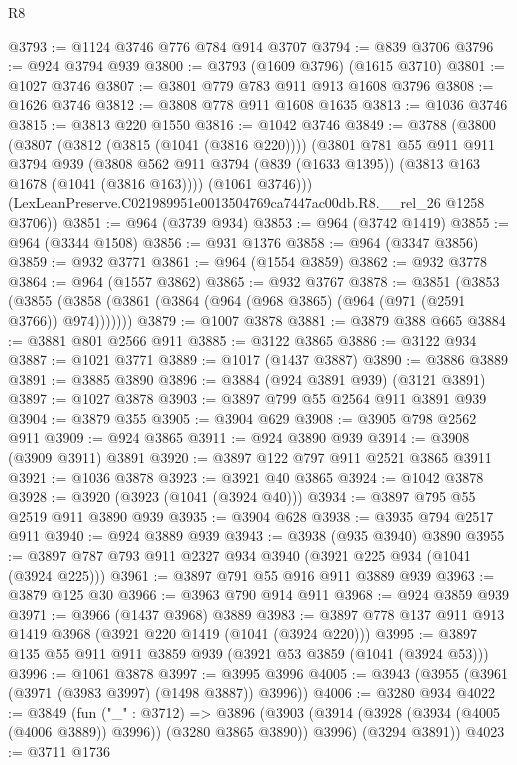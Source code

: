 \begin{lexlean}{R8}
\begin{coremodule}
@3793 := @1124 @3746 @776 @784 @914 @3707
@3794 := @839 @3706
@3796 := @924 @3794 @939
@3800 := @3793 (@1609 @3796) (@1615 @3710)
@3801 := @1027 @3746
@3807 := @3801 @779 @783 @911 @913 @1608 @3796
@3808 := @1626 @3746
@3812 := @3808 @778 @911 @1608 @1635
@3813 := @1036 @3746
@3815 := @3813 @220 @1550
@3816 := @1042 @3746
@3849 := @3788
    (@3800
      (@3807
        (@3812 (@3815 (@1041 (@3816 @220))))
        (@3801
          @781
          @55
          @911
          @911
          @3794
          @939
          (@3808 @562 @911 @3794 (@839 (@1633 @1395)) (@3813 @163 @1678 (@1041 (@3816 @163))))
          (@1061 @3746)))
      (LexLeanPreserve.C021989951e0013504769ca7447ac00db.R8.__rel_26 @1258 @3706))
@3851 := @964 (@3739 @934)
@3853 := @964 (@3742 @1419)
@3855 := @964 (@3344 @1508)
@3856 := @931 @1376
@3858 := @964 (@3347 @3856)
@3859 := @932 @3771
@3861 := @964 (@1554 @3859)
@3862 := @932 @3778
@3864 := @964 (@1557 @3862)
@3865 := @932 @3767
@3878 := @3851
    (@3853 (@3855 (@3858 (@3861 (@3864 (@964 (@968 @3865) (@964 (@971 (@2591 @3766)) @974)))))))
@3879 := @1007 @3878
@3881 := @3879 @388 @665
@3884 := @3881 @801 @2566 @911
@3885 := @3122 @3865
@3886 := @3122 @934
@3887 := @1021 @3771
@3889 := @1017 (@1437 @3887)
@3890 := @3886 @3889
@3891 := @3885 @3890
@3896 := @3884 (@924 @3891 @939) (@3121 @3891)
@3897 := @1027 @3878
@3903 := @3897 @799 @55 @2564 @911 @3891 @939
@3904 := @3879 @355
@3905 := @3904 @629
@3908 := @3905 @798 @2562 @911
@3909 := @924 @3865
@3911 := @924 @3890 @939
@3914 := @3908 (@3909 @3911) @3891
@3920 := @3897 @122 @797 @911 @2521 @3865 @3911
@3921 := @1036 @3878
@3923 := @3921 @40 @3865
@3924 := @1042 @3878
@3928 := @3920 (@3923 (@1041 (@3924 @40)))
@3934 := @3897 @795 @55 @2519 @911 @3890 @939
@3935 := @3904 @628
@3938 := @3935 @794 @2517 @911
@3940 := @924 @3889 @939
@3943 := @3938 (@935 @3940) @3890
@3955 := @3897 @787 @793 @911 @2327 @934 @3940 (@3921 @225 @934 (@1041 (@3924 @225)))
@3961 := @3897 @791 @55 @916 @911 @3889 @939
@3963 := @3879 @125 @30
@3966 := @3963 @790 @914 @911
@3968 := @924 @3859 @939
@3971 := @3966 (@1437 @3968) @3889
@3983 := @3897 @778 @137 @911 @913 @1419 @3968 (@3921 @220 @1419 (@1041 (@3924 @220)))
@3995 := @3897 @135 @55 @911 @911 @3859 @939 (@3921 @53 @3859 (@1041 (@3924 @53)))
@3996 := @1061 @3878
@3997 := @3995 @3996
@4005 := @3943 (@3955 (@3961 (@3971 (@3983 @3997) (@1498 @3887)) @3996))
@4006 := @3280 @934
@4022 := @3849
    (fun ("_" : @3712) =>
    @3896
      (@3903 (@3914 (@3928 (@3934 (@4005 (@4006 @3889)) @3996)) (@3280 @3865 @3890)) @3996)
      (@3294 @3891))
@4023 := @3711 @1736

\end{coremodule}
\end{lexlean}
